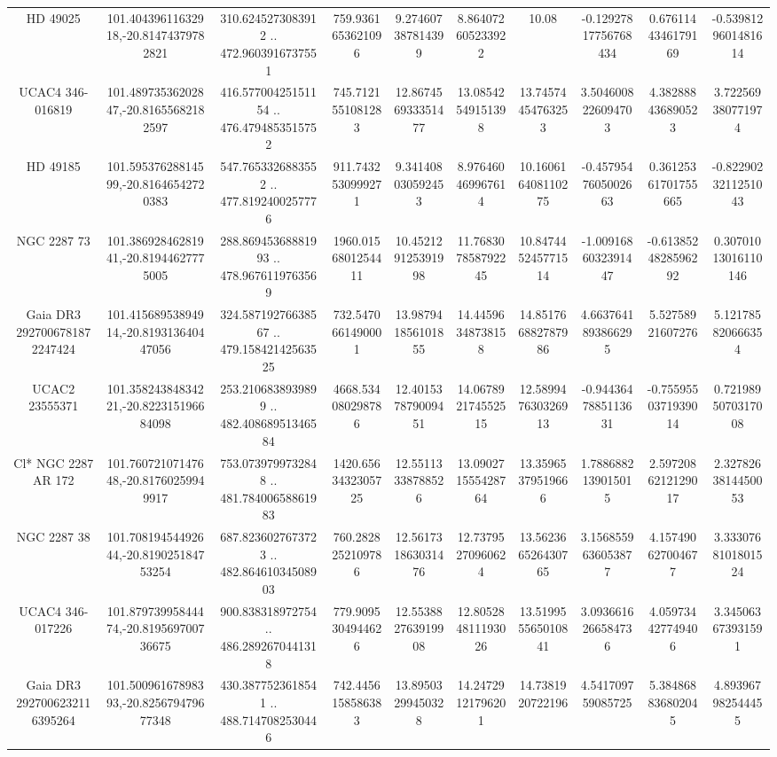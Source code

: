 \begin{table}
\begin{tabular}{cccccccccc}
HD  49025 & 101.40439611632918,-20.81474379782821 & 310.6245273083912 .. 472.9603916737551 & 759.9361653621096 & 9.274607387814399 & 8.864072605233922 & 10.08 & -0.12927817756768434 & 0.6761144346179169 & -0.5398129601481614 \\
UCAC4 346-016819 & 101.48973536202847,-20.81655682182597 & 416.57700425151154 .. 476.4794853515752 & 745.7121551081283 & 12.867456933351477 & 13.08542549151398 & 13.74574454763253 & 3.5046008226094703 & 4.382888436890523 & 3.722569380771974 \\
HD  49185 & 101.59537628814599,-20.81646542720383 & 547.7653326883552 .. 477.8192400257776 & 911.7432530999271 & 9.341408030592453 & 8.976460469967614 & 10.160616408110275 & -0.4579547605002663 & 0.36125361701755665 & -0.8229023211251043 \\
NGC  2287    73 & 101.38692846281941,-20.81944627775005 & 288.86945368881993 .. 478.9676119763569 & 1960.0156801254411 & 10.452129125391998 & 11.768307858792245 & 10.847445245771514 & -1.0091686032391447 & -0.6138524828596292 & 0.30701013016110146 \\
Gaia DR3 2927006781872247424 & 101.41568953894914,-20.819313640447056 & 324.58719276638567 .. 479.15842142563525 & 732.5470661490001 & 13.987941856101855 & 14.44596348738158 & 14.851766882787986 & 4.6637641893866295 & 5.52758921607276 & 5.121785820666354 \\
UCAC2  23555371 & 101.35824384834221,-20.822315196684098 & 253.2106838939899 .. 482.40868951346584 & 4668.534080298786 & 12.401537879009451 & 14.067892174552515 & 12.589947630326913 & -0.9443647885113631 & -0.7559550371939014 & 0.7219895070317008 \\
Cl* NGC 2287     AR     172 & 101.76072107147648,-20.81760259949917 & 753.0739799732848 .. 481.78400658861983 & 1420.6563432305725 & 12.55113338788526 & 13.090271555428764 & 13.35965379519666 & 1.7886882139015015 & 2.5972086212129017 & 2.3278263814450053 \\
NGC  2287    38 & 101.70819454492644,-20.819025184753254 & 687.8236027673723 .. 482.86461034508903 & 760.2828252109786 & 12.561731863031476 & 12.73795270960624 & 13.562366526430765 & 3.1568559636053877 & 4.157490627004677 & 3.3330768101801524 \\
UCAC4 346-017226 & 101.87973995844474,-20.819569700736675 & 900.838318972754 .. 486.2892670441318 & 779.9095304944626 & 12.553882763919908 & 12.805284811193026 & 13.519955565010841 & 3.0936616266584736 & 4.059734427749406 & 3.345063673931591 \\
Gaia DR3 2927006232116395264 & 101.50096167898393,-20.825679479677348 & 430.3877523618541 .. 488.7147082530446 & 742.4456158586383 & 13.89503299450328 & 14.24729121796201 & 14.7381920722196 & 4.541709759085725 & 5.384868836802045 & 4.893967982544455 \\

\end{tabular}
\end{table}
